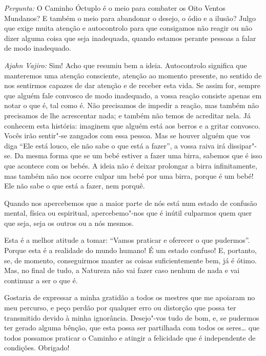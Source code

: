 \clearpage

\emph{Pergunta:} O Caminho Óctuplo é o meio para combater os Oito Ventos
Mundanos? E também o meio para abandonar o desejo, o ódio e a ilusão? Julgo que
exige muita atenção e autocontrolo para que consigamos não reagir ou não dizer
alguma coisa que seja inadequada, quando estamos perante pessoas a falar de modo
inadequado.

\emph{Ajahn Vajiro:} Sim! Acho que resumiu bem a ideia. Autocontrolo significa
que manteremos uma atenção consciente, atenção ao momento presente, no sentido
de nos sentirmos capazes de dar atenção e de receber esta vida. Se assim for,
sempre que alguém fale convosco de modo inadequado, a vossa reação consiste
apenas em notar o que é, tal como é. Não precisamos de impedir a reação, mas
também não precisamos de lhe acrescentar nada; e também não temos de acreditar
nela. Já conhecem esta história: imaginem que alguém está aos berros e a
gritar convosco. Vocês irão sentir"-se zangados com essa pessoa. Mas se houver
alguém que vos diga ``Ele está louco, ele não sabe o que está a fazer'', a vossa
raiva irá dissipar"-se. Da mesma forma que se um bebé estiver a fazer uma birra,
sabemos que é isso que acontece com os bebés. A ideia não é deixar prolongar a
birra infinitamente, mas também não nos ocorre culpar um bebé por uma birra,
porque é um bebé! Ele não sabe o que está a fazer, nem porquê.

Quando nos apercebemos que a maior parte de nós está num estado de confusão
mental, física ou espiritual, apercebemo"-nos que é inútil culparmos quem quer
que seja, seja os outros ou a nós mesmos.

Esta é a melhor atitude a tomar: ``Vamos praticar e oferecer o que pudermos''.
Porque esta é a realidade do mundo humano! É um estado confuso! E, portanto, se,
de momento, conseguirmos manter as coisas suficientemente bem, já é ótimo. Mas,
no final de tudo, a Natureza não vai fazer caso nenhum de nada e vai continuar a
ser o que é.

Gostaria de expressar a minha gratidão a todos os mestres que me apoiaram no meu
percurso, e peço perdão por qualquer erro ou distorção que possa ter transmitido
devido à minha ignorância. Desejo"-vos tudo de bom, e, se pudermos ter gerado
alguma bênção, que esta possa ser partilhada com todos os seres\ldots{} que
todos possamos praticar o Caminho e atingir a felicidade que é independente de
condições. Obrigado!

